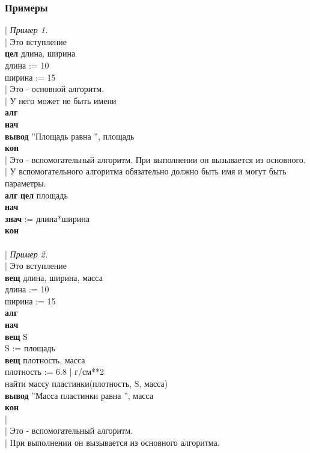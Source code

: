 \subsubsection{Примеры}
\small
{\sffamily
| \textit{Пример 1.}\\
|  Это вступление\\
\textbf{цел} длина, ширина\\
длина := 10\\
ширина := 15\\
|    Это - основной алгоритм.\\
| У него может не быть имени\\
\textbf{алг}\\
\textbf{нач}\\
\otstup \textbf{вывод} ''Площадь равна '', площадь\\
\textbf{кон}\\
| Это - вспомогательный алгоритм. При выполнении он вызывается из основного.\\
| У вспомогательного алгоритма обязательно должно быть имя и могут быть параметры.\\
\textbf{алг} \textbf{цел} площадь\\
\textbf{нач}\\
\otstup \textbf{знач} := длина*ширина\\
\textbf{кон}\\
~\\
| \textit{Пример 2.}\\
| Это вступление\\
\textbf{вещ} длина, ширина, масса\\
длина := 10\\
ширина := 15\\
\textbf{алг}\\
\textbf{нач}\\
\otstup \textbf{вещ} S\\
\otstup S := площадь\\
\otstup \textbf{вещ} плотность, масса\\
\otstup плотность := 6.8 | г/см**2\\
\otstup найти массу пластинки(плотность, S, масса)\\
\otstup \textbf{вывод} ''Масса пластинки равна '', масса\\
\textbf{кон}\\
|\\
| Это - вспомогательный алгоритм.\\
| При выполнении он вызывается из основного алгоритма.\\
}
